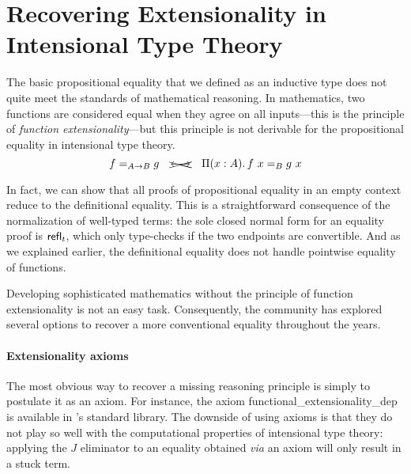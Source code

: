 \section{Recovering Extensionality in Intensional Type Theory}

The basic propositional equality that we defined as an inductive type does 
not quite meet the standards of mathematical reasoning.
% 
In mathematics, two functions are considered equal when they agree on all 
inputs---this is the principle of \emph{function extensionality}---but
% 
% 
this principle is not derivable for the propositional equality in 
intensional type theory.
\[
  \Indeq{A \to B}{f}{g} \quad \xcancel{\longleftrightarrow} \quad \Depfun{A}{\Indeq{B}{f\ x}{g\ x}}
\]

In fact, we can show that all proofs of propositional equality in an empty 
context reduce to the definitional equality.
% 
This is a straightforward consequence of the normalization of well-typed terms:
the sole closed normal form for an equality proof is \( \indrefl{t} \), which
only type-checks if the two endpoints are convertible.
% 
And as we explained earlier, the definitional equality does not handle pointwise
equality of functions.


Developing sophisticated mathematics without the principle of 
function extensionality is not an easy task.
Consequently, the community has explored several options to recover a more 
conventional equality throughout the years.

\paragraph*{Extensionality axioms}
% 
The most obvious way to recover a missing reasoning principle is simply to
postulate it as an axiom. 
% 
% 
For instance, the axiom \textsf{functional\_extensionality\_dep} is available 
in \Coq's standard library.
% 
The downside of using axioms is that they do not play so well with the 
computational properties of intensional type theory:
% 
% 
applying the \( J \) eliminator to an equality obtained \textit{via} an axiom
will only result in a stuck term.

